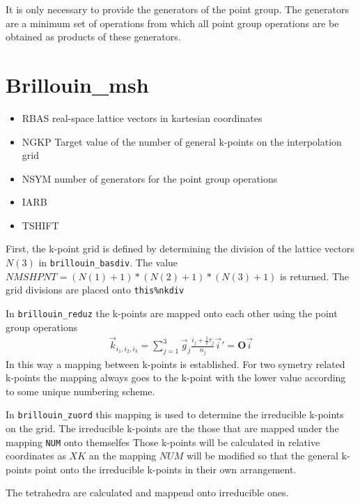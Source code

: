 \documentclass[11pt,a4paper]{report}
\newcommand{\mat}[1]{\bm{#1}}  %
\begin{document}
It is only necessary to provide the generators of the point group.
The generators are a minimum set of operations from which all point
group operations are be obtained as products of these generators.



\section{Brillouin\_msh}
\begin{itemize}
\item RBAS real-space lattice vectors in kartesian coordinates
\item NGKP Target value of the number of general
  k-points on the interpolation grid
\item NSYM number of generators for the point group operations 
\item IARB
\item TSHIFT
\end{itemize}

First, the k-point grid is defined by determining the division of the
lattice vectors $N(3)$ in \verb|brillouin_basdiv|. The value
$NMSHPNT=(N(1)+1)*(N(2)+1)*(N(3)+1)$ is returned. The grid divisions
are placed onto \verb|this%nkdiv|

In \verb|brillouin_reduz| the k-points are mapped onto each other
using the point group operations
\begin{eqnarray}
\vec{k}_{i_1,i_2,i_3}=\sum_{j=1}^3 \vec{g}_{j}\frac{i_{j}+\frac{1}{2}\tau_j}{n_{j}}
\nonumber
\vec{i}'=\mat{O}\vec{i}
\end{eqnarray}
In this way a mapping 
between k-points is established. For two symetry
related k-points the mapping always goes to the k-point with the lower
value according to some unique numbering scheme.

In \verb|brillouin_zuord| this mapping is used to determine the
irreducible k-points on the grid. The irreducible k-points are the
those that are mapped under the mapping \verb|NUM| onto themselfes
Those k-points will be calculated in relative coordinates as $XK$ an
the mapping $NUM$ will be modified so that the general k-points point
onto the irreducible k-points in their own arrangement.

The tetrahedra are calculated and mappend onto irreducible ones.



\end{document}
